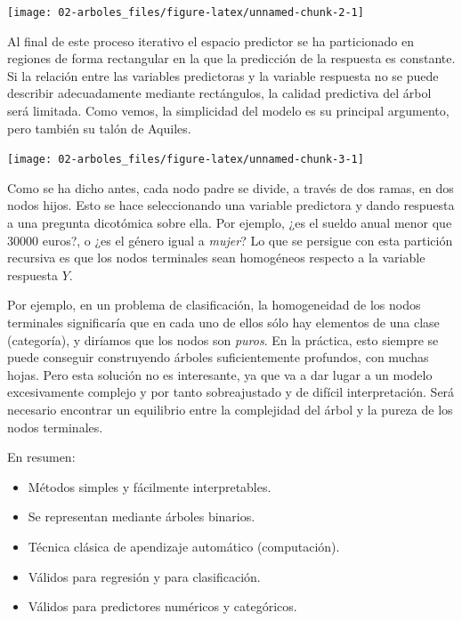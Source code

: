 \documentclass[]{book}
\theoremstyle{break}
\theoremstyle{definition}
\theoremstyle{definition}
\theoremstyle{definition}
\theoremstyle{remark}
\begin{document}
\begin{center}\texttt{[image: 02-arboles\_files/figure-latex/unnamed-chunk-2-1]} \end{center}

Al final de este proceso iterativo el espacio predictor se ha
particionado en regiones de forma rectangular en la que la predicción de
la respuesta es constante. Si la relación entre las variables
predictoras y la variable respuesta no se puede describir adecuadamente
mediante rectángulos, la calidad predictiva del árbol será limitada.
Como vemos, la simplicidad del modelo es su principal argumento, pero
también su talón de Aquiles.

\begin{center}\texttt{[image: 02-arboles\_files/figure-latex/unnamed-chunk-3-1]} \end{center}

Como se ha dicho antes, cada nodo padre se divide, a través de dos
ramas, en dos nodos hijos. Esto se hace seleccionando una variable
predictora y dando respuesta a una pregunta dicotómica sobre ella. Por
ejemplo, ¿es el sueldo anual menor que 30000 euros?, o ¿es el género
igual a \emph{mujer}? Lo que se persigue con esta partición recursiva es
que los nodos terminales sean homogéneos respecto a la variable
respuesta \(Y\).

Por ejemplo, en un problema de clasificación, la homogeneidad de los
nodos terminales significaría que en cada uno de ellos sólo hay
elementos de una clase (categoría), y diríamos que los nodos son
\emph{puros}. En la práctica, esto siempre se puede conseguir
construyendo árboles suficientemente profundos, con muchas hojas. Pero
esta solución no es interesante, ya que va a dar lugar a un modelo
excesivamente complejo y por tanto sobreajustado y de difícil
interpretación. Será necesario encontrar un equilibrio entre la
complejidad del árbol y la pureza de los nodos terminales.

En resumen:

\begin{itemize}
\item
  Métodos simples y fácilmente interpretables.
\item
  Se representan mediante árboles binarios.
\item
  Técnica clásica de apendizaje automático (computación).
\item
  Válidos para regresión y para clasificación.
\item
  Válidos para predictores numéricos y categóricos.
\end{itemize}
\end{document}

